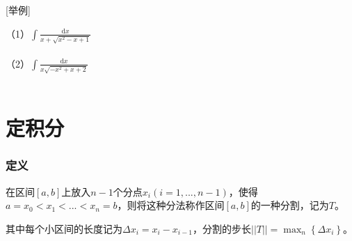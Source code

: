 \documentclass{SCIS2020cn}
\begin{document}
[举例]

（1）$\displaystyle\int{\frac{\text{d}x}{x+\sqrt{x^2-x+1}}}$\\\\

（2）$\displaystyle\int{\frac{\text{d}x}{x\sqrt{-x^2+x+2}}}$\\\\
\part{定积分}
\section{定义}
\begin{definition}[分割]\label{def3}
在区间$[a,b]$上放入$n-1$个分点$x_i(i=1,...,n-1)$，使得$a=x_0<x_1<...<x_n=b$，则将这种分法称作区间$[a,b]$的一种分割，记为$T$。

其中每个小区间的长度记为$\Delta{}x_i=x_i-x_{i-1}$，分割的步长$\displaystyle||T||=\max_{n}\left\{\Delta{}x_i\right\}$。
\end{definition}
\end{document}

